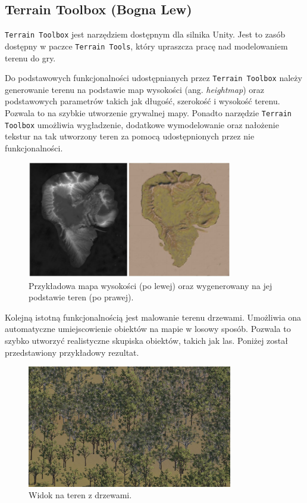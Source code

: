 \subsection{Terrain Toolbox (Bogna Lew)}\label{ss:tTool}
\texttt{Terrain Toolbox} jest narzędziem dostępnym dla silnika Unity. Jest to zasób dostępny w paczce \texttt{Terrain Tools}, który
upraszcza pracę nad modelowaniem terenu do gry.

Do podstawowych funkcjonalności udostępnianych przez \texttt{Terrain Toolbox} należy generowanie terenu na podstawie
map wysokości (ang. \textit{heightmap}) oraz podstawowych parametrów takich jak długość, szerokość i wysokość terenu.
Pozwala to na szybkie utworzenie grywalnej mapy. Ponadto narzędzie \texttt{Terrain Toolbox} umożliwia wygładzenie, dodatkowe
wymodelowanie oraz nałożenie tekstur na tak utworzony teren za pomocą udostępnionych przez nie funkcjonalności.

\begin{figure}[h!]
    \centering
    \includegraphics[width=0.8\textwidth]{images/modelowanie_terenu/przykladowe_heightmapy.jpg}
    \caption{Przykładowa mapa wysokości (po lewej) oraz wygenerowany na jej podstawie teren (po prawej).}
\end{figure}

Kolejną istotną funkcjonalnością jest malowanie terenu drzewami. Umożliwia ona automatyczne umiejscowienie obiektów na
mapie w losowy sposób. Pozwala to szybko utworzyć realistyczne skupiska obiektów, takich jak las. Poniżej
został przedstawiony przykładowy rezultat.

\begin{figure}[h!]
    \centering
    \includegraphics[width=0.8\textwidth]{images/modelowanie_terenu/drzewa.jpg}
    \caption{Widok na teren z drzewami.}
\end{figure}
